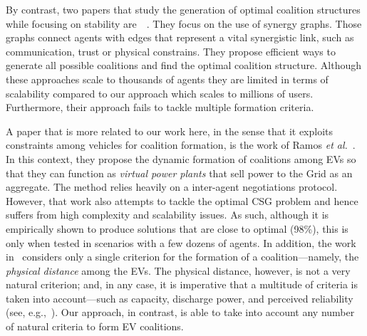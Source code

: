 By contrast, two papers that study the generation of optimal coalition structures while focusing on stability are~\cite{bistaffa2014anytime}~\cite{voice2012coalition}. They focus on the use of synergy graphs. Those graphs connect agents with edges that represent a vital synergistic link, such as communication, trust or physical constrains. They propose efficient ways to generate all possible coalitions and find the optimal coalition structure.  Although these approaches scale to thousands of agents they are limited in terms of scalability compared to our approach which scales to millions of users. Furthermore, their approach fails to tackle multiple formation criteria.

A paper that is more related to our work here, in the sense that it exploits constraints among vehicles for coalition formation, is the work of Ramos {\em et al.}~\cite{deORamos2014}. In this context, they propose the dynamic formation of coalitions among EVs so that they can function as {\em virtual power plants} that sell power to the Grid as an aggregate. The method relies heavily on a inter-agent negotiations protocol. However, that work also attempts to tackle the optimal CSG problem and hence suffers from high complexity and scalability issues. As such, although it is empirically shown to produce solutions that are close to optimal (98\%), this is only when tested in scenarios with a few dozens of agents. In addition, the work in~\cite{deORamos2014} considers only a single criterion for the formation of a coalition---namely, the {\em physical distance} among the EVs. The physical distance, however, is not a very natural criterion; and, in any case, it is imperative that a multitude of criteria is taken into account---such as capacity, discharge power, and perceived reliability (see, e.g.,~\cite{kamboj2011deploying}). Our approach, in contrast, is able to take into account any number of natural criteria to form EV coalitions.
